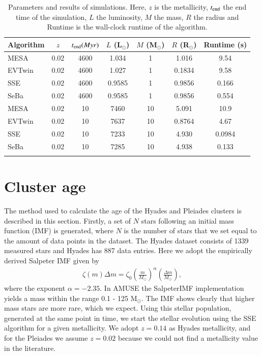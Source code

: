 \documentclass{aa}
\newcommand{\Sun}[0]{\ensuremath{_{\odot}}}
\begin{document}
\setlength\tabcolsep{2pt}
\begin{table}
    \caption[]{Parameters and results of simulations. Here, $z$ is the metallicity, $t_{\rm end}$ the end time of the simulation, $L$ the luminosity, $M$ the mass, $R$ the radius and Runtime is the wall-clock runtime of the algorithm.}
    \label{tab:parameterspace}
    \begin{tabular}{lcccccc}
        \hline
        \noalign{\smallskip}
        Algorithm & $z$ & $t_{\rm end} (Myr)$ & $L$ (L\Sun) & $M$ (M\Sun) & $R$ (R\Sun) & Runtime (s) \\
        \hline
        \noalign{\smallskip}
        MESA & 0.02 & 4600 & 1.034 & 1 & 1.016 & 9.54 \\
        EVTwin  & 0.02 & 4600 & 1.027 & 1 & 0.1834 & 9.58 \\
        SSE & 0.02 & 4600 & 0.9585 & 1 & 0.9856 & 0.166 \\
        SeBa & 0.02 & 4600 & 0.9585 & 1 & 0.9856 & 0.554 \\
        MESA & 0.02 & 10 & 7460 & 10 & 5.091 & 10.9 \\
        EVTwin & 0.02 & 10 & 7637 & 10 & 0.8764 & 4.67  \\
        SSE & 0.02 & 10 & 7233 & 10 & 4.930 & 0.0984 \\
        SeBa & 0.02 & 10 & 7285 & 10 & 4.938 & 0.133 \\
        \hline
        \noalign{\smallskip}
        \noalign{\smallskip}
    \end{tabular}
\end{table}

\section{Cluster age}\label{sec:isochrones}
The method used to calculate the age of the Hyades and Pleiades clusters is described in this section. Firstly, a set of $N$ stars following an initial mass function (IMF) is generated, where $N$ is the number of stars that we set equal to the amount of data points in the dataset. The Hyades dataset consists of 1339 measured stars and Hyades has 887 data entries. Here we adopt the empirically derived Salpeter IMF \citep{1955ApJ...121..161S} given by
\begin{eqnarray}
    \zeta(m) \Delta m = \zeta_0 \left(\frac{m}{M\Sun}\right)^{\alpha} \left(\frac{\Delta m}{M\Sun}\right),
\end{eqnarray} where the exponent $\alpha = -2.35$. In AMUSE the SalpeterIMF implementation yields a mass within the range 0.1 - 125 M\Sun. The IMF shows clearly that higher mass stars are more rare, which we expect. Using this stellar population, generated at the same point in time, we start the stellar evolution using the SSE algorithm for a given metallicity. We adopt $z = 0.14$ \citep{1998A&A...331...81P} as Hyades metallicity, and for the Pleiades we assume $z = 0.02$ because we could not find a metallicity value in the literature.
\end{document}
